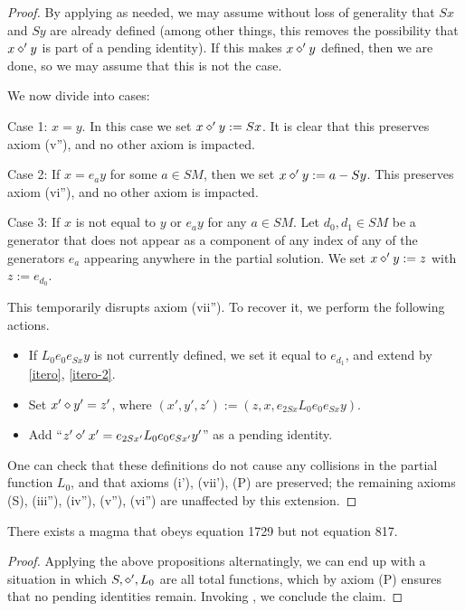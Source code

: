 \begin{proof}  By applying  as needed, we may assume without loss of generality that $Sx$ and $Sy$ are already defined (among other things, this removes the possibility that $x \diamond' y$ is part of a pending identity).  If this makes $x \diamond' y$ defined, then we are done, so we may assume that this is not the case.

We now divide into cases:

Case 1: $x=y$.  In this case we set $x \diamond' y := Sx$.  It is clear that this preserves axiom (v''), and no other axiom is impacted.

Case 2: If $x = e_a y$ for some $a \in SM$, then we set $x \diamond' y := a - Sy$.  This preserves axiom (vi''), and no other axiom is impacted.

Case 3: If $x$ is not equal to $y$ or $e_a y$ for any $a \in SM$.  Let $d_0, d_1 \in SM$ be a generator that does not appear as a component of any index of any of the generators $e_a$ appearing anywhere in the partial solution.  We set $x \diamond' y := z$ with $z := e_{d_0}$.

This temporarily disrupts axiom (vii'').  To recover it, we perform the following actions.
\begin{itemize}
  \item If $L_0 e_0 e_{Sx} y$ is not currently defined, we set it equal to $e_{d_1}$, and extend by \eqref{itero}, \eqref{itero-2}.
  \item Set $x' \diamond y' = z'$, where $(x',y',z') := (z, x, e_{2Sx} L_0 e_0 e_{Sx} y)$.
  \item Add ``$z' \diamond' x' = e_{2Sx'} L_0 e_0 e_{Sx'} y'$'' as a pending identity.
\end{itemize}

One can check that these definitions do not cause any collisions in the partial function $L_0$, and that axioms (i'), (vii'), (P) are preserved; the remaining axioms (S), (iii''), (iv''), (v''), (vi'') are unaffected by this extension.
\end{proof}


\begin{theorem}\label{1729_refute_817} There exists a magma that obeys equation 1729 but not equation 817.
\end{theorem}

\begin{proof}
  Applying the above propositions alternatingly, we can end up with a situation in which $S, \diamond', L_0$ are all total functions, which by axiom (P) ensures that no pending identities remain.  Invoking , we conclude the claim.
\end{proof}
